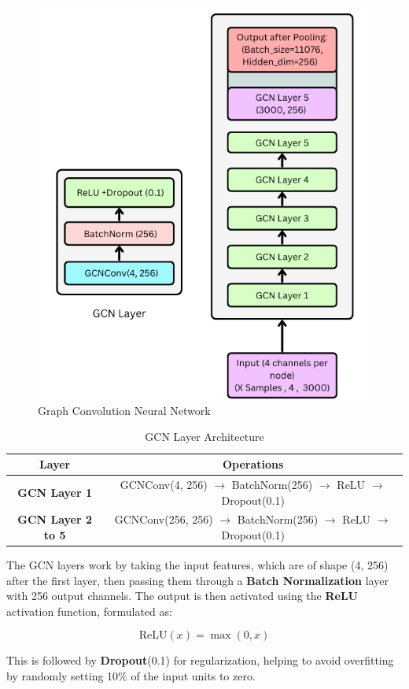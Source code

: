 \begin{figure}
    \centering
    \includegraphics[width=0.7\linewidth]{img/Graph Convolution Neural Network.png}
    \caption{Graph Convolution Neural Network}
    \label{fig:enter-label}
\end{figure}
\begin{table}[ht]
\centering
\caption{GCN Layer Architecture}

\begin{tabular}{|c|c|}
\hline
\textbf{Layer} & \textbf{Operations} \\
\hline
\textbf{GCN Layer 1} & GCNConv(4, 256) $\rightarrow$ BatchNorm(256) $\rightarrow$ ReLU $\rightarrow$ Dropout(0.1) \\
\hline
\textbf{GCN Layer 2 to 5} & GCNConv(256, 256) $\rightarrow$ BatchNorm(256) $\rightarrow$ ReLU $\rightarrow$ Dropout(0.1) \\
\hline
\end{tabular}
\end{table}


 

 

The GCN layers work by taking the input features, which are of shape (4, 256) after the first layer, then passing them through a \textbf{Batch Normalization} layer with 256 output channels. The output is then activated using the \textbf{ReLU} activation function, formulated as:

\[
\text{ReLU}(x) = \max(0, x)
\]


This is followed by \textbf{Dropout}(0.1) for regularization, helping to avoid overfitting by randomly setting 10\% of the input units to zero.

